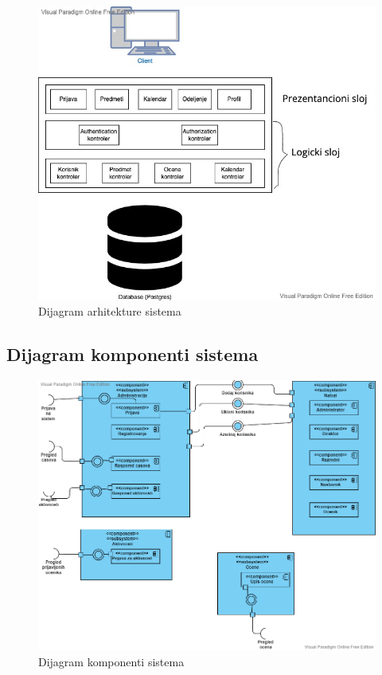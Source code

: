 \documentclass{article}
\begin{document}
\begin{figure} [!ht]
    \begin{center}
        \includegraphics[scale=0.6]{imgs/arhitekturav2.jpeg}
    \end{center}
\caption{Dijagram arhitekture sistema}
\end{figure}

\newpage
\subsection{Dijagram komponenti sistema}
\begin{figure} [!ht]
    \begin{center}
        \includegraphics[scale=0.5]{imgs/dijagram_komponenti.png}
    \end{center}
\caption{Dijagram komponenti sistema}
\end{figure}
\end{document}
